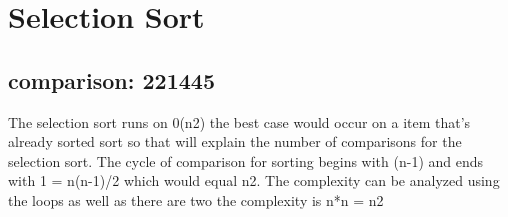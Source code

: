 \documentclass{article}
\begin{document}
\section{Selection Sort}
\subsection{comparison: 221445}
\large The selection sort runs on 0(n2) the best case would occur on a item that's already sorted sort so that will explain the number of comparisons for the selection sort. The cycle of comparison for sorting begins with (n-1) and ends with 1 = n(n-1)/2 which would equal n2. The complexity can be analyzed using the loops as well as there are two the complexity is n*n = n2
\end{document}
